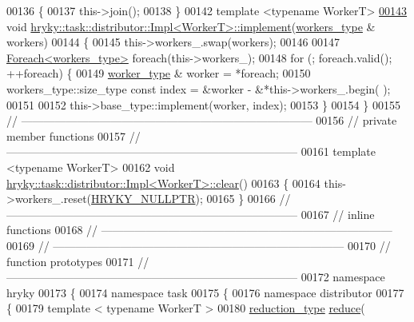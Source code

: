 \begin{DoxyCode}
00136 \{
00137     this->join();
00138 \}
00142 \textcolor{keyword}{template} <\textcolor{keyword}{typename} WorkerT>
\hypertarget{task__distributor__impl_8h_source_l00143}{}\hyperlink{group__task_gaf3c6d1475b000e7f2cf6b7448fc2dfdc}{00143} \textcolor{keywordtype}{void} \hyperlink{classhryky_1_1task_1_1distributor_1_1_impl}{hryky::task::distributor::Impl<WorkerT>::implement}(\hyperlink{classhryky_1_1_vector}{workers_type} & workers)
00144 \{
00145     this->workers\_.swap(workers);
00146 
00147     \hyperlink{classhryky_1_1_foreach}{Foreach<workers_type>} \textcolor{keywordflow}{foreach}(this->workers\_);
00148     \textcolor{keywordflow}{for} (; \textcolor{keywordflow}{foreach}.valid(); ++\textcolor{keywordflow}{foreach}) \{
00149         \hyperlink{classhryky_1_1task_1_1worker_1_1_base}{worker_type} & worker = *\textcolor{keywordflow}{foreach};
00150         workers\_type::size\_type \textcolor{keyword}{const} index = &worker - &*this->workers\_.begin(
      );
00151         
00152         this->base\_type::implement(worker, index);
00153     \}
00154 \}
00155 \textcolor{comment}{//
      ------------------------------------------------------------------------------}
00156 \textcolor{comment}{// private member functions}
00157 \textcolor{comment}{//
      ------------------------------------------------------------------------------}
00161 \textcolor{comment}{}\textcolor{keyword}{template} <\textcolor{keyword}{typename} WorkerT>
00162 \textcolor{keywordtype}{void} \hyperlink{namespacehryky_aa201297ea9530da954a7230be71cc19d}{hryky::task::distributor::Impl<WorkerT>::clear}()
00163 \{
00164     this->workers\_.reset(\hyperlink{common_8h_a4cd4ac09cfcdbd6b30ee69afc156e210}{HRYKY_NULLPTR});
00165 \}
00166 \textcolor{comment}{//
      ------------------------------------------------------------------------------}
00167 \textcolor{comment}{// inline functions}
00168 \textcolor{comment}{//
      ------------------------------------------------------------------------------}
00169 \textcolor{comment}{//
      ------------------------------------------------------------------------------}
00170 \textcolor{comment}{// function prototypes}
00171 \textcolor{comment}{//
      ------------------------------------------------------------------------------}
00172 \textcolor{keyword}{namespace }hryky
00173 \{
00174 \textcolor{keyword}{namespace }task
00175 \{
00176 \textcolor{keyword}{namespace }distributor
00177 \{
00179     \textcolor{keyword}{template} < \textcolor{keyword}{typename} WorkerT >
00180     \hyperlink{classhryky_1_1_intrusive_ptr}{reduction_type} \hyperlink{group__task_ga89a7a92c43485c438438ab4b97184a27}{reduce}(

\end{DoxyCode}
